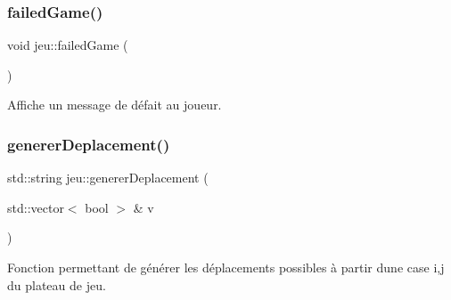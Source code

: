 \subsubsection{\texorpdfstring{failed\+Game()}{failedGame()}}
{\footnotesize\ttfamily void jeu\+::failed\+Game (\begin{DoxyParamCaption}{ }\end{DoxyParamCaption})}



Affiche un message de défait au joueur. 

\mbox{\label{classjeu_a58d74300f8d64b3d3cd151e0838ef232}} 
\subsubsection{\texorpdfstring{generer\+Deplacement()}{genererDeplacement()}}
{\footnotesize\ttfamily std\+::string jeu\+::generer\+Deplacement (\begin{DoxyParamCaption}\item[{std\+::vector$<$ bool $>$ \&}]{v }\end{DoxyParamCaption})}



Fonction permettant de générer les déplacements possibles à partir d\textquotesingle{}une case {\ttfamily i,j} du plateau de jeu. 

